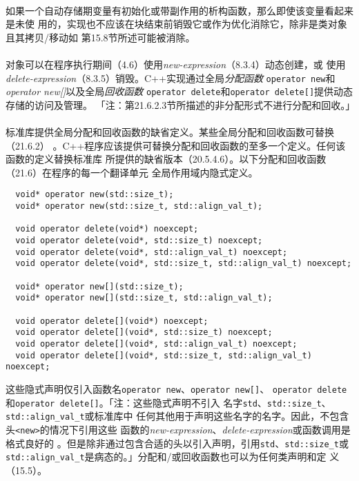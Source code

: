 \paragraph{}
如果一个自动存储期变量有初始化或带副作用的析构函数，那么即使该变量看起来是未使
用的，实现也不应该在块结束前销毁它或作为优化消除它，除非是类对象且其拷贝/移动如
第15.8节所述可能被消除。

\paragraph{}
对象可以在程序执行期间（4.6）使用\textit{new-expression}（8.3.4）动态创建，或
使用\textit{delete-expression}（8.3.5）销毁。C++实现通过全局\textit{分配函数}
\texttt{operator new}和\textit{operator new[]}以及全局\textit{回收函数}
\texttt{operator delete}和\texttt{operator delete[]}提供动态存储的访问及管理。
「注：第21.6.2.3节所描述的非分配形式不进行分配和回收。」

\paragraph{}
标准库提供全局分配和回收函数的缺省定义。某些全局分配和回收函数可替换（21.6.2）
。C++程序应该提供可替换分配和回收函数的至多一个定义。任何该函数的定义替换标准库
所提供的缺省版本（20.5.4.6）。以下分配和回收函数（21.6）在程序的每一个翻译单元
全局作用域内隐式定义。
\begin{lstlisting}
  void* operator new(std::size_t);
  void* operator new(std::size_t, std::align_val_t);

  void operator delete(void*) noexcept;
  void operator delete(void*, std::size_t) noexcept;
  void operator delete(void*, std::align_val_t) noexcept;
  void operator delete(void*, std::size_t, std::align_val_t) noexcept;

  void* operator new[](std::size_t);
  void* operator new[](std::size_t, std::align_val_t);

  void operator delete[](void*) noexcept;
  void operator delete[](void*, std::size_t) noexcept;
  void operator delete[](void*, std::align_val_t) noexcept;
  void operator delete[](void*, std::size_t, std::align_val_t) noexcept;
\end{lstlisting}
这些隐式声明仅引入函数名\texttt{operator new}、\texttt{operator new[]}、
\texttt{operator delete}和\texttt{operator delete[]}。「注：这些隐式声明不引入
名字\texttt{std}、\texttt{std::size\_t}、\texttt{std::align\_val\_t}或标准库中
任何其他用于声明这些名字的名字。因此，不包含头\texttt{<new>}的情况下引用这些
函数的\textit{new-expression}、\textit{delete-expression}或函数调用是格式良好的
。但是除非通过包含合适的头以引入声明，引用\texttt{std}、\texttt{std::size\_t}或
\texttt{std::align\_val\_t}是病态的。」分配和/或回收函数也可以为任何类声明和定
义（15.5）。

